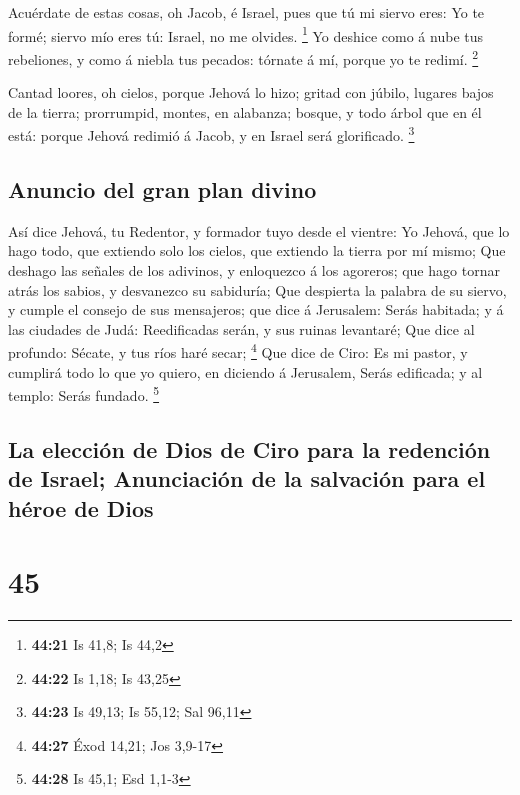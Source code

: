  Acuérdate de estas cosas, oh Jacob, é Israel, pues que tú
mi siervo eres: Yo te formé; siervo mío eres tú: Israel, no me olvides.
\footnote{\textbf{44:21} Is 41,8; Is 44,2}  Yo deshice como
á nube tus rebeliones, y como á niebla tus pecados: tórnate á mí, porque
yo te redimí. \footnote{\textbf{44:22} Is 1,18; Is 43,25}

 Cantad loores, oh cielos, porque Jehová lo hizo; gritad
con júbilo, lugares bajos de la tierra; prorrumpid, montes, en alabanza;
bosque, y todo árbol que en él está: porque Jehová redimió á Jacob, y en
Israel será glorificado. \footnote{\textbf{44:23} Is 49,13; Is 55,12;
  Sal 96,11}

\hypertarget{anuncio-del-gran-plan-divino}{%
\subsection{Anuncio del gran plan
divino}\label{anuncio-del-gran-plan-divino}}

 Así dice Jehová, tu Redentor, y formador tuyo desde el
vientre: Yo Jehová, que lo hago todo, que extiendo solo los cielos, que
extiendo la tierra por mí mismo;  Que deshago las señales
de los adivinos, y enloquezco á los agoreros; que hago tornar atrás los
sabios, y desvanezco su sabiduría;  Que despierta la
palabra de su siervo, y cumple el consejo de sus mensajeros; que dice á
Jerusalem: Serás habitada; y á las ciudades de Judá: Reedificadas serán,
y sus ruinas levantaré;  Que dice al profundo: Sécate, y
tus ríos haré secar; \footnote{\textbf{44:27} Éxod 14,21; Jos 3,9-17}
 Que dice de Ciro: Es mi pastor, y cumplirá todo lo que yo
quiero, en diciendo á Jerusalem, Serás edificada; y al templo: Serás
fundado. \footnote{\textbf{44:28} Is 45,1; Esd 1,1-3}

\hypertarget{la-elecciuxf3n-de-dios-de-ciro-para-la-redenciuxf3n-de-israel-anunciaciuxf3n-de-la-salvaciuxf3n-para-el-huxe9roe-de-dios}{%
\subsection{La elección de Dios de Ciro para la redención de Israel;
Anunciación de la salvación para el héroe de
Dios}\label{la-elecciuxf3n-de-dios-de-ciro-para-la-redenciuxf3n-de-israel-anunciaciuxf3n-de-la-salvaciuxf3n-para-el-huxe9roe-de-dios}}

\hypertarget{section-44}{%
\section{45}\label{section-44}}

